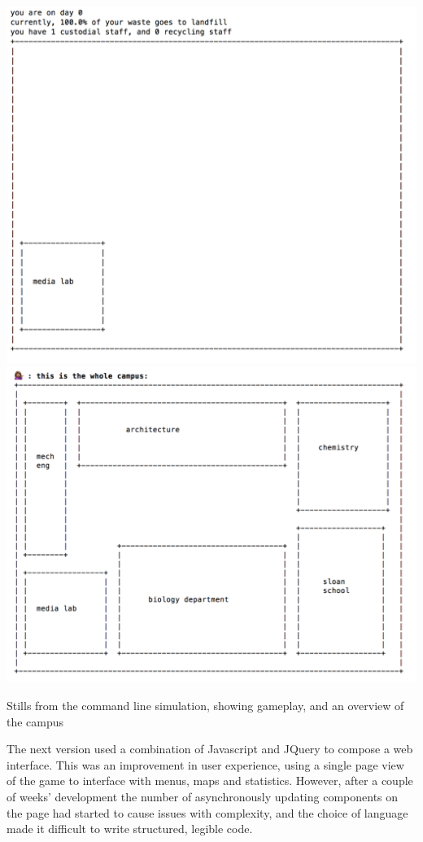 \documentclass[nofonts,nols,justified,nobib]{tufte-book}
\begin{document}
\begin{marginfigure}
\includegraphics[width=\textwidth]{img/3/prototyping/early-day.png}
\includegraphics[width=\textwidth]{img/3/prototyping/early-map.png}
\caption{Stills from the command line simulation, showing gameplay, and an overview of the campus}
\end{marginfigure}

The next version used a combination of Javascript and JQuery to compose a web interface. This was an improvement in user experience, using a single page view of the game to interface with menus, maps and statistics. However, after a couple of weeks' development the number of asynchronously updating components on the page had started to cause issues with complexity, and the choice of language made it difficult to write structured, legible code.
\end{document}
